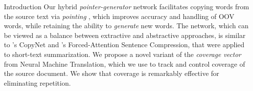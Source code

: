 \documentclass[11pt,a4paper]{article}
\begin{document}
\begin{section}{Introduction}
Our hybrid \textit{pointer-generator} network facilitates copying
words from the source text via \textit{pointing} \cite{vinyals2015pointer}, which improves accuracy and handling of OOV words, while retaining the ability to \textit{generate} new words.
The network, which can be viewed as a balance between extractive and abstractive approaches, is similar to \citeauthor{gu2016incorporating}'s  CopyNet and \citeauthor{miao2016language}'s  Forced-Attention Sentence Compression, that were applied to short-text summarization.
We propose a novel variant of the \textit{coverage vector} \cite{tu2016modeling} from Neural Machine Translation, which we use to track and control coverage of the source document.
We show that coverage is remarkably effective for eliminating repetition.
\end{section} 
\end{document}
